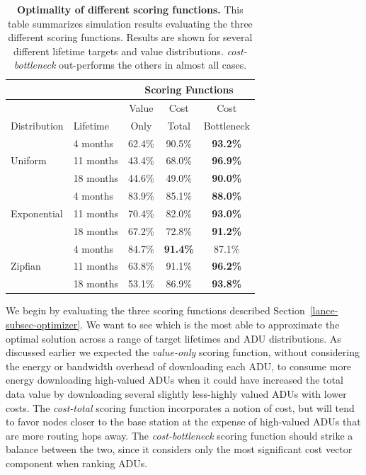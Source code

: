 \begin{table}[t]
\begin{center}
\begin{tabular}{|l|l|ccc|}
\hline
& & \multicolumn{3}{|c|}{Scoring Functions} \\ \hline
& & Value & Cost & Cost \\
Distribution & Lifetime & Only & Total & Bottleneck \\ \hline
\multirow{3}{*}{Uniform} & 4 months & 62.4\% & 90.5\% & \textbf{93.2\%} \\
& 11 months & 43.4\% & 68.0\% & \textbf{96.9\%} \\
& 18 months & 44.6\% & 49.0\% & \textbf{90.0\%} \\ \hline
\multirow{3}{*}{Exponential} & 4 months & 83.9\% & 85.1\% & \textbf{88.0\%}
\\
& 11 months & 70.4\% & 82.0\% & \textbf{93.0\%} \\
& 18 months & 67.2\% & 72.8\% & \textbf{91.2\%} \\ \hline
\multirow{3}{*}{Zipfian} & 4 months & 84.7\% & \textbf{91.4\%} & 87.1\% \\
& 11 months & 63.8\% & 91.1\% & \textbf{96.2\%} \\
& 18 months & 53.1\% & 86.9\% & \textbf{93.8\%} \\ \hline
\end{tabular}
\end{center}

\caption{\textbf{Optimality of different scoring functions.} This table
summarizes simulation results evaluating the three different scoring
functions. Results are shown for several different lifetime targets and value
distributions. \textit{cost-bottleneck} out-performs the others in almost all
cases.}

\label{lance-fig-table}
\end{table}

We begin by evaluating the three scoring functions described
Section~\ref{lance-subsec-optimizer}. We want to see which is the most able
to approximate the optimal solution across a range of target lifetimes and
ADU distributions. As discussed earlier we expected the \textit{value-only}
scoring function, without considering the energy or bandwidth overhead of
downloading each ADU, to consume more energy downloading high-valued ADUs
when it could have increased the total data value by downloading several
slightly less-highly valued ADUs with lower costs. The \textit{cost-total}
scoring function incorporates a notion of cost, but will tend to favor nodes
closer to the base station at the expense of high-valued ADUs that are more
routing hops away. The \textit{cost-bottleneck} scoring function should
strike a balance between the two, since it considers only the most
significant cost vector component when ranking ADUs.

